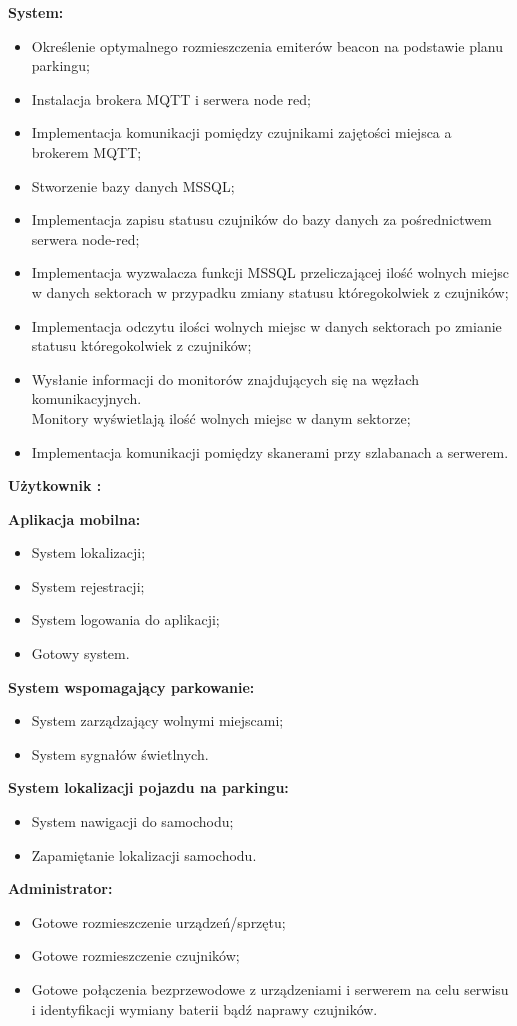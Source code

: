 \documentclass[12pt,a4paper]{article}
\begin{document}
{\large \bf System:}
\begin{itemize}
\item Określenie optymalnego rozmieszczenia emiterów beacon na podstawie planu parkingu;
\item Instalacja brokera MQTT i serwera node red;
\item Implementacja komunikacji pomiędzy czujnikami zajętości miejsca a brokerem MQTT;
\item Stworzenie bazy danych MSSQL;
\item Implementacja zapisu statusu czujników do bazy danych za pośrednictwem serwera node-red;
\item Implementacja wyzwalacza funkcji MSSQL przeliczającej ilość wolnych miejsc w danych sektorach w przypadku zmiany statusu któregokolwiek z czujników;
\item Implementacja odczytu ilości wolnych miejsc w danych sektorach po zmianie statusu któregokolwiek z czujników;
\item Wysłanie informacji do monitorów znajdujących się na węzłach komunikacyjnych.\\Monitory wyświetlają ilość wolnych miejsc w danym sektorze;
\item Implementacja komunikacji pomiędzy skanerami przy szlabanach a serwerem.
\end{itemize}
{\large \bf Użytkownik :}

{\bf Aplikacja mobilna:}
\begin{itemize}
\item System lokalizacji;
\item System rejestracji;
\item System logowania do aplikacji;
\item Gotowy system.
\end{itemize}

{\bf System wspomagający parkowanie:}
\begin{itemize}
\item System zarządzający wolnymi miejscami;
\item System sygnałów świetlnych.
\end{itemize}

{\bf System lokalizacji pojazdu na parkingu:}
\begin{itemize}
\item System nawigacji do samochodu;
\item Zapamiętanie lokalizacji samochodu.
\end{itemize}
{\large \bf Administrator:}
\begin{itemize}
\item Gotowe rozmieszczenie urządzeń/sprzętu;
\item Gotowe rozmieszczenie czujników;
\item Gotowe połączenia bezprzewodowe z urządzeniami i serwerem na celu serwisu i identyfikacji wymiany baterii bądź naprawy czujników.
\end{itemize}
\end{document}
